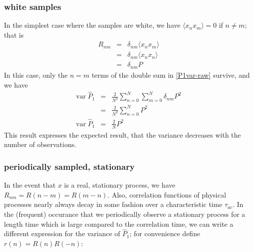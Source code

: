 \subsubsection{white samples}

In the simplest case where the samples are white, we have $\langle x_n
x_m \rangle = 0$ if $n \ne m$; that is
\begin{eqnarray}
R_{nm} &=& \delta_{nm} \langle x_n x_m \rangle \\
      &=& \delta_{nm} \langle x_n x_n \rangle \\
      &=& \delta_{nm} P
\end{eqnarray}
In this case, only the $n = m$ terms of the double sum in
\eqref{P1var-raw} survive, and we have
\begin{eqnarray}
\textrm{var}\;\hat{P}_1 &=&  \frac{2}{N^2}\sum_{n=0}^N \sum_{m=0}^N 
  \delta_{nm} P^2 \\
  &=& \frac{2}{N^2} \sum_{n=0}^N P^2 \\
\textrm{var}\;\hat{P}_1 &=& \frac{2}{N} P^2
\end{eqnarray}
This result expresses the expected result, that the variance decreases
with the number of observations.

\subsubsection{periodically sampled, stationary}

In the event that $x$ is a real, stationary process, we have $R_{nm} = 
R(n-m) = R(m-n)$.  Also, correlation functions of physical processes
nearly always decay in some fashion over a characteristic time
$\tau_{ac}$.  In the (frequent) occurance that we periodically observe
a stationary process for a length time which is large compared to the
correlation time, we can write a different expression for the
variance of $\hat{P}_1$; for convenience define $r(n) = R(n)R(-n)$:

